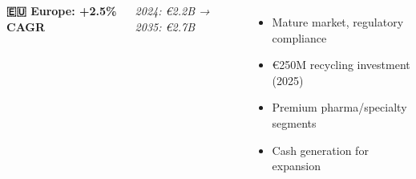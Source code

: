 \documentclass[aspectratio=169,12pt,xcolor=dvipsnames]{beamer}
\newcommand{\highlight}[1]{{\color{alpla_blue}\textbf{#1}}}
\begin{document}
\begin{frame}
\begin{columns}[T]
    \vspace{0.5cm}

    \textbf{\highlight{🇪🇺 Europe: +2.5\% CAGR}}

    \textit{2024: €2.2B → 2035: €2.7B}

    \begin{itemize}
      \item Mature market, regulatory compliance
      \item €250M recycling investment (2025)
      \item Premium pharma/specialty segments
      \item Cash generation for expansion
    \end{itemize}

  \end{columns}

\end{frame}

\end{document}
